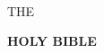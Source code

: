 \thispagestyle{empty}
\begin{titlepage}
    ~
    
    \medskip
    
    {\large THE}
    
    \medskip
    
    {\Huge \textbf{\textsc{HOLY BIBLE}}}
    
    \vfill
\end{titlepage}
